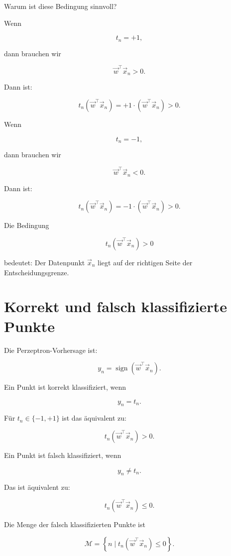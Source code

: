 Warum ist diese Bedingung sinnvoll?

Wenn

\[
    t_n=+1,
\]

dann brauchen wir

\[
    \vec{w}^{\top}\vec{x}_n > 0.
\]

Dann ist:

\[
    t_n(\vec{w}^{\top}\vec{x}_n)
    =
    +1\cdot(\vec{w}^{\top}\vec{x}_n)
    >
    0.
\]

Wenn

\[
    t_n=-1,
\]

dann brauchen wir

\[
    \vec{w}^{\top}\vec{x}_n < 0.
\]

Dann ist:

\[
    t_n(\vec{w}^{\top}\vec{x}_n)
    =
    -1\cdot(\vec{w}^{\top}\vec{x}_n)
    >
    0.
\]

\begin{conceptbox}
Die Bedingung

\[
    t_n(\vec{w}^{\top}\vec{x}_n)>0
\]

bedeutet:
Der Datenpunkt \(\vec{x}_n\) liegt auf der richtigen Seite der Entscheidungsgrenze.
\end{conceptbox}

\section{Korrekt und falsch klassifizierte Punkte}

Die Perzeptron-Vorhersage ist:

\[
    y_n
    =
    \operatorname{sign}(\vec{w}^{\top}\vec{x}_n).
\]

Ein Punkt ist korrekt klassifiziert, wenn

\[
    y_n=t_n.
\]

Für \(t_n \in \{-1,+1\}\) ist das äquivalent zu:

\[
    t_n(\vec{w}^{\top}\vec{x}_n)>0.
\]

Ein Punkt ist falsch klassifiziert, wenn

\[
    y_n\neq t_n.
\]

Das ist äquivalent zu:

\[
    t_n(\vec{w}^{\top}\vec{x}_n)\leq 0.
\]

\begin{definitionbox}
Die Menge der falsch klassifizierten Punkte ist

\[
    \mathcal{M}
    =
    \left\{
        n
        \mid
        t_n(\vec{w}^{\top}\vec{x}_n)\leq 0
    \right\}.
\]
\end{definitionbox}

